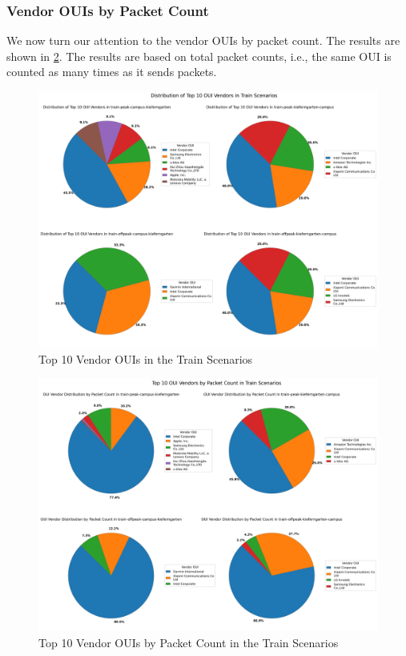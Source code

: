 \documentclass[sigconf,nonacm]{acmart}
\begin{document}
\subsubsection{Vendor OUIs by Packet Count}
\label{sec:part-1/train/oui-packet-count}
We now turn our attention to the vendor OUIs by packet count. The results are shown in \cref{tab:train_oui_packet_count}. The results are based on total packet counts, i.e., the same OUI is counted as many times as it sends packets.
\begin{figure}
    \centering
    \includegraphics[width=\columnwidth]{images/part1/oui-vendors/train-scenarios.png}
    \caption{Top 10 Vendor OUIs in the Train Scenarios}
    \label{tab:train_oui}
\end{figure}

\begin{figure}
    \centering
    \includegraphics[width=\columnwidth]{images/part1/oui-vendors/train-scenarios-packet-count.png}
    \caption{Top 10 Vendor OUIs by Packet Count in the Train Scenarios}
    \label{tab:train_oui_packet_count}
\end{figure}
\end{document}
